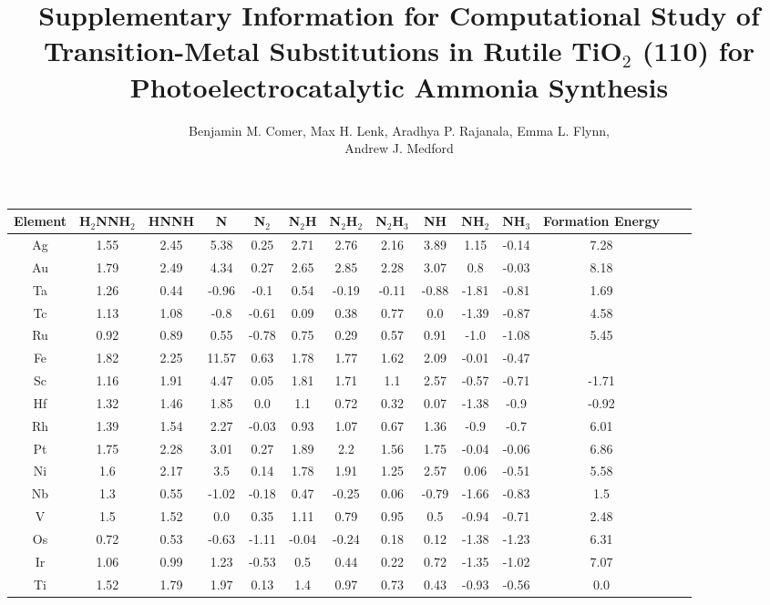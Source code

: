 \documentclass{article}
\title{\TitleFont Supplementary Information for Computational Study of Transition-Metal Substitutions in Rutile TiO$_2$ (110) for Photoelectrocatalytic Ammonia Synthesis}
\author{Benjamin M. Comer, Max H. Lenk, Aradhya P. Rajanala, Emma L. Flynn,\\ Andrew J. Medford}
\begin{document}
\maketitle
\begin{table}
\setlength\tabcolsep{2pt}
\begin{center}
\begin{tabular}{| c | c | c | c | c | c | c | c | c | c | c | c | c | c |}
\hline
Element & H$_2$NNH$_2$ & HNNH & N & N$_2$ & N$_2$H & N$_2$H$_2$ & N$_2$H$_3$ & NH & NH$_2$ & NH$_3$ & Formation Energy\\
\hline

Ag & 1.55 & 2.45 & 5.38 & 0.25 & 2.71 & 2.76 & 2.16 & 3.89 & 1.15 & -0.14 & 7.28 \\
Au & 1.79 & 2.49 & 4.34 & 0.27 & 2.65 & 2.85 & 2.28 & 3.07 & 0.8 & -0.03 & 8.18 \\
Ta & 1.26 & 0.44 & -0.96 & -0.1 & 0.54 & -0.19 & -0.11 & -0.88 & -1.81 & -0.81 & 1.69 \\
Tc & 1.13 & 1.08 & -0.8 & -0.61 & 0.09 & 0.38 & 0.77 & 0.0 & -1.39 & -0.87 & 4.58 \\
Ru & 0.92 & 0.89 & 0.55 & -0.78 & 0.75 & 0.29 & 0.57 & 0.91 & -1.0 & -1.08 & 5.45 \\
Fe & 1.82 & 2.25 & 11.57 & 0.63 & 1.78 & 1.77 & 1.62 & 2.09 & -0.01 & -0.47 &  \\
Sc & 1.16 & 1.91 & 4.47 & 0.05 & 1.81 & 1.71 & 1.1 & 2.57 & -0.57 & -0.71 & -1.71 \\
Hf & 1.32 & 1.46 & 1.85 & 0.0 & 1.1 & 0.72 & 0.32 & 0.07 & -1.38 & -0.9 & -0.92 \\
Rh & 1.39 & 1.54 & 2.27 & -0.03 & 0.93 & 1.07 & 0.67 & 1.36 & -0.9 & -0.7 & 6.01 \\
Pt & 1.75 & 2.28 & 3.01 & 0.27 & 1.89 & 2.2 & 1.56 & 1.75 & -0.04 & -0.06 & 6.86 \\
Ni & 1.6 & 2.17 & 3.5 & 0.14 & 1.78 & 1.91 & 1.25 & 2.57 & 0.06 & -0.51 & 5.58 \\
Nb & 1.3 & 0.55 & -1.02 & -0.18 & 0.47 & -0.25 & 0.06 & -0.79 & -1.66 & -0.83 & 1.5 \\
V & 1.5 & 1.52 & 0.0 & 0.35 & 1.11 & 0.79 & 0.95 & 0.5 & -0.94 & -0.71 & 2.48 \\
Os & 0.72 & 0.53 & -0.63 & -1.11 & -0.04 & -0.24 & 0.18 & 0.12 & -1.38 & -1.23 & 6.31 \\
Ir & 1.06 & 0.99 & 1.23 & -0.53 & 0.5 & 0.44 & 0.22 & 0.72 & -1.35 & -1.02 & 7.07 \\
Ti & 1.52 & 1.79 & 1.97 & 0.13 & 1.4 & 0.97 & 0.73 & 0.43 & -0.93 & -0.56 & 0.0 \\

\end{tabular}
\end{center}
\end{table}
\end{document}
